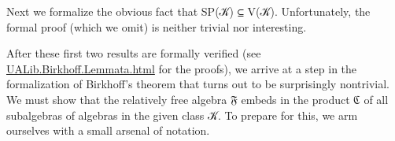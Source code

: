 \documentclass[a4paper,UKenglish,cleveref,autoref,thm-restate]{lipics-v2021}
\begin{document}
Next we formalize the obvious fact that \ad S\ad P(\ab 𝒦) \af ⊆ \ad V(\ab 𝒦). Unfortunately, the formal proof (which we omit) is neither trivial nor interesting.
\ccpad
\begin{code}%
\>[0][@{}l@{\AgdaIndent{1}}]%
\>[1]\AgdaSpace{}%
\AgdaSymbol{:}\AgdaSpace{}%
\AgdaSymbol{\{}\AgdaSymbol{\}\{}\AgdaSymbol{\}}\AgdaSpace{}%
\AgdaSymbol{(}\AgdaSymbol{\{}\AgdaSymbol{\}\{}\AgdaSymbol{\}}\AgdaSpace{}%
\AgdaSymbol{)}\AgdaSpace{}%
\AgdaSpace{}%
\AgdaSymbol{\{}\AgdaSymbol{\}\{}\AgdaSymbol{\}}\AgdaSpace{}%
\<%
\end{code}
\ccpad
After these first two results are formally verified (see \href{https://ualib.gitlab.io/UALib.Birkhoff.Lemmata.html}{UALib.Birkhoff.Lemmata.html} for the proofs), we arrive at a step in the formalization of Birkhoff's theorem that turns out to be surprisingly nontrivial. We must show that the relatively free algebra \af 𝔉 embeds in the product \af ℭ of all subalgebras of algebras in the given class \ab 𝒦.
To prepare for this, we arm ourselves with a small arsenal of notation.
\ccpad
\end{document}
